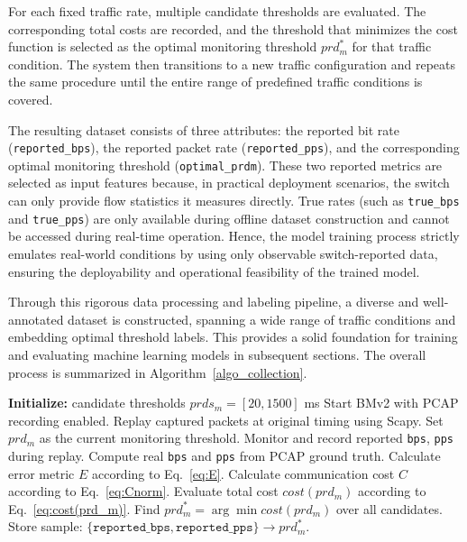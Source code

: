 For each fixed traffic rate, multiple candidate thresholds are evaluated. 
The corresponding total costs are recorded, and the threshold that minimizes the cost function is selected as the optimal monitoring threshold $prd_m^*$ for that traffic condition. The system then transitions to a new traffic configuration and repeats the same procedure until the entire range of predefined traffic conditions is covered.

The resulting dataset consists of three attributes: the reported bit rate (\texttt{reported\_bps}), the reported packet rate (\texttt{reported\_pps}), and the corresponding optimal monitoring threshold (\texttt{optimal\_prdm}). 
These two reported metrics are selected as input features because, in practical deployment scenarios, the switch can only provide flow statistics it measures directly. 
True rates (such as \texttt{true\_bps} and \texttt{true\_pps}) are only available during offline dataset construction and cannot be accessed during real-time operation. 
Hence, the model training process strictly emulates real-world conditions by using only observable switch-reported data, ensuring the deployability and operational feasibility of the trained model.

Through this rigorous data processing and labeling pipeline, a diverse and well-annotated dataset is constructed, spanning a wide range of traffic conditions and embedding optimal threshold labels. 
This provides a solid foundation for training and evaluating machine learning models in subsequent sections. The overall process is summarized in Algorithm~\ref{algo_collection}.

\begin{algorithm}[!t]
    \caption{Data processing}
    \label{algo_collection}
    \begin{algorithmic}[1]
        \STATE \textbf{Initialize:} candidate thresholds $prds_m = [20, 1500]$ ms
        \STATE Start BMv2 with PCAP recording enabled.
        \STATE Replay captured packets at original timing using Scapy.
        \STATE Set $prd_m$ as the current monitoring threshold.
        \STATE Monitor and record reported \texttt{bps}, \texttt{pps} during replay.
        \STATE Compute real \texttt{bps} and \texttt{pps} from PCAP ground truth.
        \STATE Calculate error metric $E$ according to Eq.~\ref{eq:E}.
        \STATE Calculate communication cost $C$ according to Eq.~\ref{eq:Cnorm}.
        \STATE Evaluate total cost $cost(prd_m)$ according to Eq.~\ref{eq:cost(prd_m)}.
        \ENDFOR
        \STATE Find $prd_m^* = \arg\min cost(prd_m)$ over all candidates.
        \STATE Store sample: $\{\texttt{reported\_bps}, \texttt{reported\_pps}\} \rightarrow prd_m^*$.
        \ENDFOR
    \end{algorithmic}
\end{algorithm}
